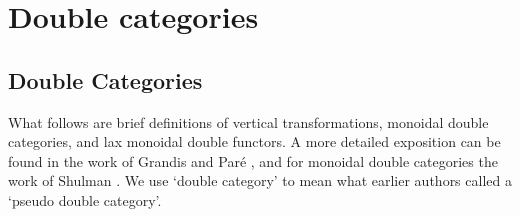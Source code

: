 \section{Double categories}

\subsection*{Double Categories}

What follows are brief definitions of vertical transformations, monoidal double categories, and lax monoidal double functors. A more detailed exposition can be found in the work of Grandis and Par\'e \cite{GP1,GP2} , and for monoidal double categories the work of Shulman \cite{Shulman2} . We use `double category' to mean what earlier authors called a `pseudo double category'.


